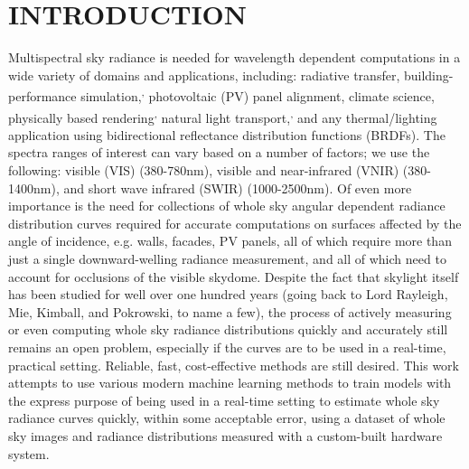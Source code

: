 \section{INTRODUCTION}
\label{sec:introduction}

Multispectral sky radiance is needed for wavelength dependent computations in a wide variety of domains and applications, including: radiative transfer,\cite{chandrasekhar_radiative} building-performance simulation,\textsuperscript{,} photovoltaic (PV) panel alignment\cite{smith_tilt}, climate science,\cite{lopez-alvarez_using_2008} physically based rendering\textsuperscript{,} natural light transport,\textsuperscript{,} and any thermal/lighting application using bidirectional reflectance distribution functions (BRDFs).\cite{kurt_survey, cook_torrance_brdf, deering_atmospheric, nicodemus_brdf} The spectra ranges of interest can vary based on a number of factors; we use the following: visible (VIS) (380-780nm), visible and near-infrared (VNIR) (380-1400nm), and short wave infrared (SWIR) (1000-2500nm). Of even more importance is the need for collections of whole sky angular dependent radiance distribution curves required for accurate computations on surfaces affected by the angle of incidence, e.g. walls, facades, PV panels, all of which require more than just a single downward-welling radiance measurement, and all of which need to account for occlusions of the visible skydome.\cite{schumann_environment} Despite the fact that skylight itself has been studied for well over one hundred years (going back to Lord Rayleigh\cite{strutt_lightfromsky_1871}, Mie\cite{mie_beitrage_1908}, Kimball\cite{kimball_intensity}, and Pokrowski\cite{pokrowski_1929}, to name a few), the process of actively measuring or even computing whole sky radiance distributions quickly and accurately still remains an open problem, especially if the curves are to be used in a real-time, practical setting. Reliable, fast, cost-effective methods are still desired. This work attempts to use various modern machine learning methods to train models with the express purpose of being used in a real-time setting to estimate whole sky radiance curves quickly, within some acceptable error, using a dataset of whole sky images and radiance distributions measured with a custom-built hardware system.\cite{kider_framework_2014}


